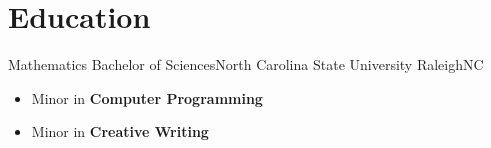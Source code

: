 \documentclass[11pt,letterpaper]{moderncv}
\begin{document}
\setlength{\parskip}{4em}

\makecvtitle
\section{Education}
    {Mathematics Bachelor of Sciences}{North Carolina State University}
    {Raleigh}{NC}
    {
        \begin{itemize}
            \item Minor in \textbf{Computer Programming}
            \item Minor in \textbf{Creative Writing}
        \end{itemize}
    }
\end{document}
